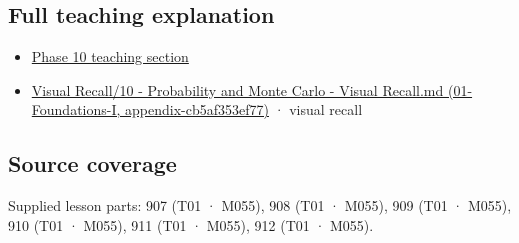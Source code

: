 \subsection{Full teaching explanation}\label{appendix-4d0203f7944f-full-teaching-explanation}

\begin{itemize}
\tightlist
\item
  \hyperref[02-foundations-ii-ch023-random-quantities-and-their-probability-laws]{Phase 10 teaching section}
\item
  \href{../01-Foundations-I/main.pdf\#nameddest=appendix-cb5af353ef77}{Visual Recall/10 - Probability and Monte Carlo - Visual Recall.md (01-Foundations-I, appendix-cb5af353ef77)} · visual recall
\end{itemize}

\subsection{Source coverage}\label{appendix-4d0203f7944f-source-coverage}

Supplied lesson parts: 907 (T01 · M055), 908 (T01 · M055), 909 (T01 · M055), 910 (T01 · M055), 911 (T01 · M055), 912 (T01 · M055).
